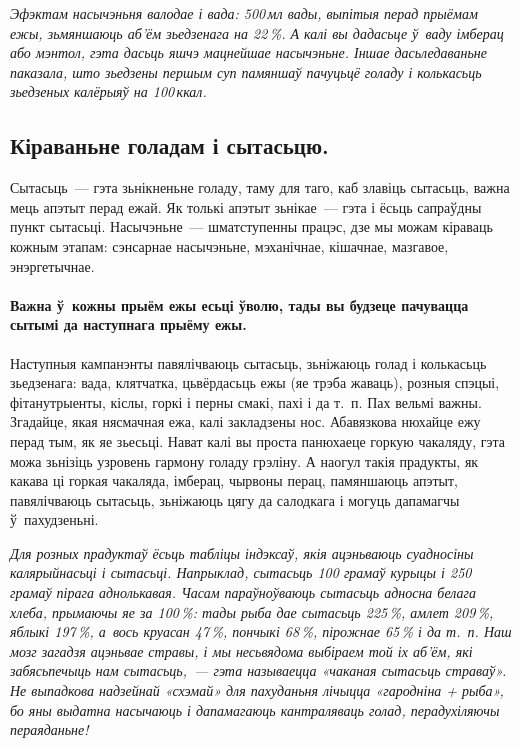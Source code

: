 
\emph{Эфэктам насычэньня валодае і вада: 500\,мл вады, выпітыя перад прыёмам ежы, зьмяншаюць аб'ём зьедзенага на 22\,\%. А калі вы дадасьце ў~ваду імберац або мэнтол, гэта дасьць яшчэ мацнейшае насычэньне. Іншае дасьледаваньне паказала, што зьедзены першым суп памяншаў пачуцьцё голаду і колькасьць зьедзеных калёрыяў на 100\,ккал.}

\subsection*{Кіраваньне голадам і сытасьцю.}
Сытасьць~--- гэта зьнікненьне голаду, таму для таго, каб злавіць сытасьць, важна мець апэтыт перад ежай. Як толькі апэтыт зьнікае~--- гэта і ёсьць сапраўдны пункт сытасьці. Насычэньне~--- шматступенны працэс, дзе мы можам кіраваць кожным этапам: сэнсарнае насычэньне, мэханічнае, кішачнае, мазгавое, энэргетычнае.

\paragraph{Важна ў~кожны прыём ежы есьці ўволю, тады вы будзеце пачувацца сытымі да наступнага прыёму ежы.} Наступныя кампанэнты павялічваюць сытасьць, зьніжаюць голад і колькасьць зьедзенага: вада, клятчатка, цьвёрдасьць ежы (яе трэба жаваць), розныя спэцыі, фітанутрыенты, кіслы, горкі і перны смакі, пахі і да т.~п. Пах вельмі важны. Згадайце, якая нясмачная ежа, калі закладзены нос. Абавязкова нюхайце ежу перад тым, як яе зьесьці. Нават калі вы проста панюхаеце горкую чакаляду, гэта можа зьнізіць узровень гармону голаду грэліну. А наогул такія прадукты, як какава ці горкая чакаляда, імберац, чырвоны перац, памяншаюць апэтыт, павялічваюць сытасьць, зьніжаюць цягу да салодкага і могуць дапамагчы ў~пахудзеньні.

\emph{Для розных прадуктаў ёсьць табліцы індэксаў, якія ацэньваюць суадносіны калярыйнасьці і сытасьці. Напрыклад, сытасьць 100 грамаў курыцы і 250 грамаў пірага аднолькавая. Часам параўноўваюць сытасьць адносна белага хлеба, прымаючы яе за 100\,\%: тады рыба дае сытасьць 225\,\%, амлет 209\,\%, яблыкі 197\,\%, а~вось круасан 47\,\%, пончыкі 68\,\%, пірожнае 65\,\% і да т.~п. Наш мозг загадзя ацэньвае стравы, і мы несьвядома выбіраем той іх аб'ём, які забясьпечыць нам сытасьць,~--- гэта называецца «чаканая сытасьць страваў». Не выпадкова надзейнай «схэмай» для пахуданьня лічыцца «гародніна + рыба», бо яны выдатна насычаюць і дапамагаюць кантраляваць голад, перадухіляючы пераяданьне!}

